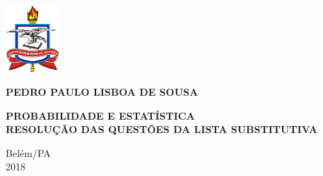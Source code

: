 \thispagestyle{empty}
\begin{titlepage}
  \begin{center}
    \includegraphics[height=2.5cm]{./figuras/brasaoUFPA.png}\\
    {}
  \end{center}
  \vspace{3.6cm}
  \begin{center}
   {\large {\uppercase{\textbf{Pedro Paulo Lisboa de Sousa}}}}
  \end{center}
  \vspace{3cm}
  \begin{center}
    {\bf{
        \large{ \uppercase{Probabilidade e Estatística} } \\
    \normalsize{ \uppercase{Resolução das questões da lista substitutiva} }}}
  \end{center}
  \vfill
  \begin{center}
    \begin{small}
      Belém/PA\\
      2018
    \end{small}
  \end{center}
  \newpage
  
\end{titlepage}
